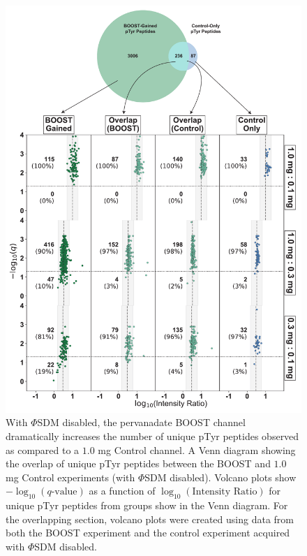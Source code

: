 \documentclass[journal=jprobs,manuscript=article]{achemso}
\begin{document}
\begin{figure}[t!]
\centering
\includegraphics[width=135mm]{figures/supplements/boost_control_gained_qvolcanoes.pdf}
\caption{With $\Phi$SDM disabled, the pervanadate BOOST channel dramatically increases the number of unique pTyr peptides observed as compared to a $1.0$ mg Control channel. A Venn diagram showing the overlap of unique pTyr peptides between the BOOST and $1.0$ mg Control experiments (with $\Phi$SDM disabled). Volcano plots show $-\log_{10}(q\text{-value})$ as a function of $\log_{10}(\text{Intensity Ratio})$ for unique pTyr peptides from groups show in the Venn diagram. For the overlapping section, volcano plots were created using data from both the BOOST experiment and the control experiment acquired with $\Phi$SDM disabled. }\label{boost_control_gained_qvolcanoes}
\end{figure}
\end{document}
